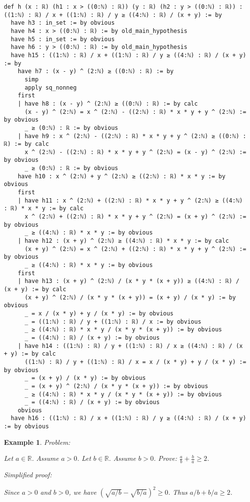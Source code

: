 \documentclass{article}
\newtheorem{example}{Example}
\begin{document}
\begin{tcolorbox}[colback=white!10, width=\linewidth]
\begin{lstlisting}[language=Lean4]
def h (x : ℝ) (h1 : x > ((0:ℕ) : ℝ)) (y : ℝ) (h2 : y > ((0:ℕ) : ℝ)) : ((1:ℕ) : ℝ) / x + ((1:ℕ) : ℝ) / y ≥ ((4:ℕ) : ℝ) / (x + y) := by
  have h3 : in_set := by obvious
  have h4 : x > ((0:ℕ) : ℝ) := by old_main_hypothesis
  have h5 : in_set := by obvious
  have h6 : y > ((0:ℕ) : ℝ) := by old_main_hypothesis
  have h15 : ((1:ℕ) : ℝ) / x + ((1:ℕ) : ℝ) / y ≥ ((4:ℕ) : ℝ) / (x + y) := by
    have h7 : (x - y) ^ (2:ℕ) ≥ ((0:ℕ) : ℝ) := by
      simp
      apply sq_nonneg
    first
    | have h8 : (x - y) ^ (2:ℕ) ≥ ((0:ℕ) : ℝ) := by calc
      (x - y) ^ (2:ℕ) = x ^ (2:ℕ) - ((2:ℕ) : ℝ) * x * y + y ^ (2:ℕ) := by obvious
      _ ≥ (0:ℕ) : ℝ := by obvious
    | have h9 : x ^ (2:ℕ) - ((2:ℕ) : ℝ) * x * y + y ^ (2:ℕ) ≥ ((0:ℕ) : ℝ) := by calc
      x ^ (2:ℕ) - ((2:ℕ) : ℝ) * x * y + y ^ (2:ℕ) = (x - y) ^ (2:ℕ) := by obvious
      _ ≥ (0:ℕ) : ℝ := by obvious
    have h10 : x ^ (2:ℕ) + y ^ (2:ℕ) ≥ ((2:ℕ) : ℝ) * x * y := by obvious
    first
    | have h11 : x ^ (2:ℕ) + ((2:ℕ) : ℝ) * x * y + y ^ (2:ℕ) ≥ ((4:ℕ) : ℝ) * x * y := by calc
      x ^ (2:ℕ) + ((2:ℕ) : ℝ) * x * y + y ^ (2:ℕ) = (x + y) ^ (2:ℕ) := by obvious
      _ ≥ ((4:ℕ) : ℝ) * x * y := by obvious
    | have h12 : (x + y) ^ (2:ℕ) ≥ ((4:ℕ) : ℝ) * x * y := by calc
      (x + y) ^ (2:ℕ) = x ^ (2:ℕ) + ((2:ℕ) : ℝ) * x * y + y ^ (2:ℕ) := by obvious
      _ ≥ ((4:ℕ) : ℝ) * x * y := by obvious
    first
    | have h13 : (x + y) ^ (2:ℕ) / (x * y * (x + y)) ≥ ((4:ℕ) : ℝ) / (x + y) := by calc
      (x + y) ^ (2:ℕ) / (x * y * (x + y)) = (x + y) / (x * y) := by obvious
      _ = x / (x * y) + y / (x * y) := by obvious
      _ = ((1:ℕ) : ℝ) / y + ((1:ℕ) : ℝ) / x := by obvious
      _ ≥ ((4:ℕ) : ℝ) * x * y / (x * y * (x + y)) := by obvious
      _ = ((4:ℕ) : ℝ) / (x + y) := by obvious
    | have h14 : ((1:ℕ) : ℝ) / y + ((1:ℕ) : ℝ) / x ≥ ((4:ℕ) : ℝ) / (x + y) := by calc
      ((1:ℕ) : ℝ) / y + ((1:ℕ) : ℝ) / x = x / (x * y) + y / (x * y) := by obvious
      _ = (x + y) / (x * y) := by obvious
      _ = (x + y) ^ (2:ℕ) / (x * y * (x + y)) := by obvious
      _ ≥ ((4:ℕ) : ℝ) * x * y / (x * y * (x + y)) := by obvious
      _ = ((4:ℕ) : ℝ) / (x + y) := by obvious
    obvious
  have h16 : ((1:ℕ) : ℝ) / x + ((1:ℕ) : ℝ) / y ≥ ((4:ℕ) : ℝ) / (x + y) := by obvious

\end{lstlisting}
\end{tcolorbox}


\begin{example}
Problem:
\begin{tcolorbox}[colback=yellow!10, width=\linewidth]
Let $a\in\mathbb{R}$. Assume $a > 0$.
    Let $b\in\mathbb{R}$. Assume $b > 0$.
    Prove: $\frac{a}{b} + \frac{b}{a} \ge 2$.
\end{tcolorbox}

Simplified proof:
\begin{tcolorbox}[colback=blue!10, width=\linewidth]
Since $a>0$ and $b>0$, we have $(\sqrt{a/b} - \sqrt{b/a})^2 \ge 0$. Thus $a/b + b/a \ge 2$.
\end{tcolorbox}
\end{example}
\end{document}
